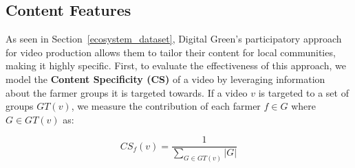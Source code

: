 \documentclass[manuscript,screen]{acmart}
\begin{document}







\subsection{Content Features} \label{content_features}

As seen in Section~\ref{ecosystem_dataset}, Digital Green's participatory approach for video production allows them to tailor their content for local communities, making it highly specific. First, to evaluate the effectiveness of this approach, we model the \textbf{Content Specificity (CS)} of a video by leveraging information about the farmer groups it is targeted towards. If a video $v$ is targeted to a set of groups $GT(v)$, we measure the contribution of each farmer $f \in G$ where $G \in GT(v)$ as:

\begin{equation}
    CS_{f}(v) = \frac{1}{\sum_{G \in GT(v)} |G|}
\end{equation}
\end{document}
